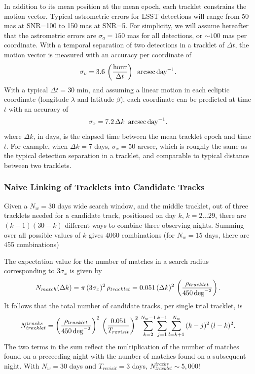 In addition to its mean position at the mean epoch, each tracklet constrains the motion vector. 
Typical astrometric errors for LSST detections will range from 50 mas at SNR=100 to 150 mas at 
SNR=5. For simplicity, we will assume hereafter that the astrometric errors are $\sigma_a=150$ mas 
for all detections, or $\sim 100$ mas per coordinate. With a temporal separation of two detections in 
a tracklet of $\Delta t$, the motion vector is measured with an accuracy per coordinate of 
\begin{equation}
\label{eq:sigv}
          \sigma_v = 3.6 \, \left({\rm hour} \over \Delta t\right) \,\,\, {\rm arcsec} \, {\rm day}^{-1}.
\end{equation}
With a typical $\Delta t = 30$ min, and assuming a linear motion in each ecliptic coordinate (longitude
$\lambda$ and latitude $\beta$), each coordinate can be predicted at time $t$ with an accuracy of  
\begin{equation}
          \sigma_x = 7.2 \, \Delta k \,\,\, {\rm arcsec} \, {\rm day}^{-1}.
\end{equation}
where $\Delta k$, in days, is the elapsed time between the mean tracklet epoch and time $t$. 
For example, when $\Delta k = 7$ days, $\sigma_x = 50$ arcsec, which is roughly the same 
as the typical detection separation in a tracklet, and comparable to typical distance between
two tracklets. 


\subsubsection{Naive Linking of Tracklets into Candidate Tracks} 

Given a $N_w= 30$ days wide search window, and the middle tracklet, out of three tracklets
needed for a candidate track, positioned on day $k$, $k=2\dots29$, there are $(k-1)(30-k)$
different ways to combine three observing nights. Summing over all possible values of $k$
gives 4060 combinations (for $N_w= 15$ days, there are 455 combinations) 

The expectation value for the number of matches in a search radius corresponding to $3\sigma_x$ 
is given by
\begin{equation}
       N_{match}(\Delta k) = \pi \, (3 \sigma_x)^2 \, \rho_{tracklet} = 
                     0.051 \, (\Delta k)^2 \, \left( \rho_{tracklet}  \over 450 \, {\rm deg}^{-2} \right).
\end{equation}
It follows that the total number of candidate tracks, per single trial tracklet, is
\begin{equation}
\label{eq:Ntt}
       N_{tracklet}^{tracks} = \left( \rho_{tracklet}  \over 450 \, {\rm deg}^{-2} \right)^2 \, \left({0.051 \over T_{revisit}}\right)^2 \, 
               \sum_{k=2}^{N_w-1} \sum_{j=1}^{k-1} \sum_{l=k+1}^{N_w} \, (k-j)^2 \, (l-k)^2. 
\end{equation}
The two terms in the sum reflect the multiplication of the number of matches found on a preceeding
night with the number of matches found on a subsequent night. With $N_w= 30$ days and 
$T_{revisit}=3$ days, $N_{tracklet}^{tracks} \sim 5,000$!  

